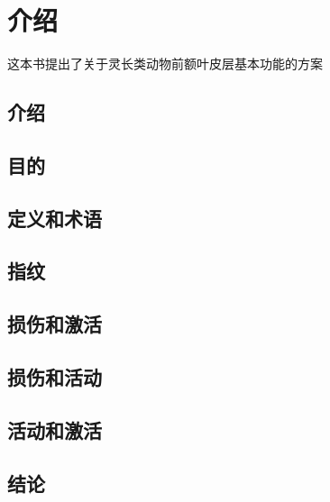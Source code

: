 \chapter{介绍}
这本书提出了关于灵长类动物前额叶皮层基本功能的方案
\section{介绍}

\section{目的}

\section{定义和术语}


\section{指纹}

\section{损伤和激活}

\section{损伤和活动}

\section{活动和激活}




\section{结论}



